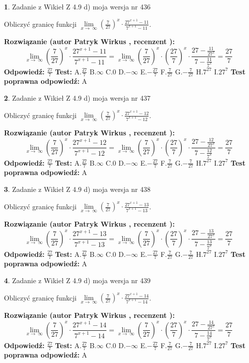 \documentclass[12pt, a4paper]{article}
\theoremstyle{definition} %
\newtheorem{zad}{}
\newcommand{\zadStart}[1]{\begin{zad}#1\newline}
\newcommand{\zadStop}{\end{zad}}
\newcommand{\rozwStart}[2]{\noindent \textbf{Rozwiązanie (autor #1 , recenzent #2): }\newline}
\newcommand{\rozwStop}{\newline}
\newcommand{\odpStart}{\noindent \textbf{Odpowiedź:}\newline}
\newcommand{\odpStop}{\newline}
\newcommand{\testStart}{\noindent \textbf{Test:}\newline}
\newcommand{\testStop}{\newline}
\newcommand{\kluczStart}{\noindent \textbf{Test poprawna odpowiedź:}\newline}
\newcommand{\kluczStop}{\newline}
\begin{document}
\zadStart{Zadanie z Wikieł Z 4.9 d) moja wersja nr 436}


Obliczyć granicę funkcji  $\lim\limits_{x\to\ \infty}(\frac{7}{27})^{x}\cdot\frac{27^{x+1}-11}{7^{x+1}-11}$.
\zadStop
\rozwStart{Patryk Wirkus}{}
$$\lim\limits_{x\to\ \infty}(\frac{7}{27})^{x}\cdot\frac{27^{x+1}-11}{7^{x+1}-11}=\lim\limits_{x\to\ \infty}(\frac{7}{27})^{x}\cdot(\frac{27}{7})^{x} \cdot \frac{27-\frac{11}{27^{x}}}{7-\frac{11}{7^{x}}} = \frac{27}{7}$$
\rozwStop
\odpStart
$\frac{27}{7}$
\odpStop
\testStart
A.$\frac{27}{7}$ B.$\infty$ C.$0$ D.$-\infty$ E.$-\frac{27}{7}$
F.$\frac{7}{27}$ G.$-\frac{7}{27}$
H.$7^{27}$
I.$27^{7}$
\testStop
\kluczStart
A
\kluczStop



\zadStart{Zadanie z Wikieł Z 4.9 d) moja wersja nr 437}


Obliczyć granicę funkcji  $\lim\limits_{x\to\ \infty}(\frac{7}{27})^{x}\cdot\frac{27^{x+1}-12}{7^{x+1}-12}$.
\zadStop
\rozwStart{Patryk Wirkus}{}
$$\lim\limits_{x\to\ \infty}(\frac{7}{27})^{x}\cdot\frac{27^{x+1}-12}{7^{x+1}-12}=\lim\limits_{x\to\ \infty}(\frac{7}{27})^{x}\cdot(\frac{27}{7})^{x} \cdot \frac{27-\frac{12}{27^{x}}}{7-\frac{12}{7^{x}}} = \frac{27}{7}$$
\rozwStop
\odpStart
$\frac{27}{7}$
\odpStop
\testStart
A.$\frac{27}{7}$ B.$\infty$ C.$0$ D.$-\infty$ E.$-\frac{27}{7}$
F.$\frac{7}{27}$ G.$-\frac{7}{27}$
H.$7^{27}$
I.$27^{7}$
\testStop
\kluczStart
A
\kluczStop



\zadStart{Zadanie z Wikieł Z 4.9 d) moja wersja nr 438}


Obliczyć granicę funkcji  $\lim\limits_{x\to\ \infty}(\frac{7}{27})^{x}\cdot\frac{27^{x+1}-13}{7^{x+1}-13}$.
\zadStop
\rozwStart{Patryk Wirkus}{}
$$\lim\limits_{x\to\ \infty}(\frac{7}{27})^{x}\cdot\frac{27^{x+1}-13}{7^{x+1}-13}=\lim\limits_{x\to\ \infty}(\frac{7}{27})^{x}\cdot(\frac{27}{7})^{x} \cdot \frac{27-\frac{13}{27^{x}}}{7-\frac{13}{7^{x}}} = \frac{27}{7}$$
\rozwStop
\odpStart
$\frac{27}{7}$
\odpStop
\testStart
A.$\frac{27}{7}$ B.$\infty$ C.$0$ D.$-\infty$ E.$-\frac{27}{7}$
F.$\frac{7}{27}$ G.$-\frac{7}{27}$
H.$7^{27}$
I.$27^{7}$
\testStop
\kluczStart
A
\kluczStop



\zadStart{Zadanie z Wikieł Z 4.9 d) moja wersja nr 439}


Obliczyć granicę funkcji  $\lim\limits_{x\to\ \infty}(\frac{7}{27})^{x}\cdot\frac{27^{x+1}-14}{7^{x+1}-14}$.
\zadStop
\rozwStart{Patryk Wirkus}{}
$$\lim\limits_{x\to\ \infty}(\frac{7}{27})^{x}\cdot\frac{27^{x+1}-14}{7^{x+1}-14}=\lim\limits_{x\to\ \infty}(\frac{7}{27})^{x}\cdot(\frac{27}{7})^{x} \cdot \frac{27-\frac{14}{27^{x}}}{7-\frac{14}{7^{x}}} = \frac{27}{7}$$
\rozwStop
\odpStart
$\frac{27}{7}$
\odpStop
\testStart
A.$\frac{27}{7}$ B.$\infty$ C.$0$ D.$-\infty$ E.$-\frac{27}{7}$
F.$\frac{7}{27}$ G.$-\frac{7}{27}$
H.$7^{27}$
I.$27^{7}$
\testStop
\kluczStart
A
\kluczStop
\end{document}
